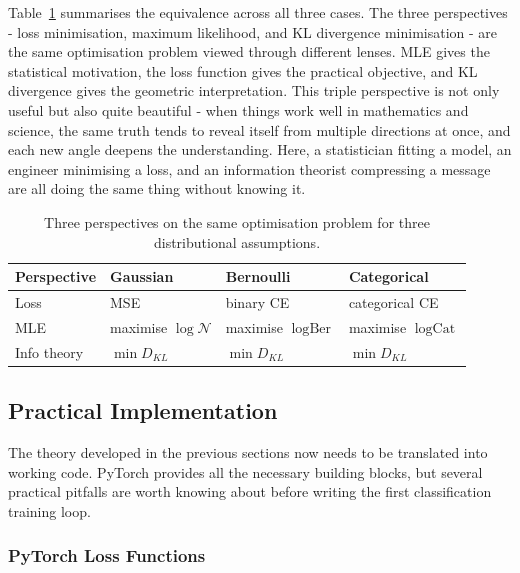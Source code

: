 Table~\ref{tab:three_views} summarises the equivalence across all three cases. The three perspectives - loss minimisation, maximum likelihood, and KL divergence minimisation - are the same optimisation problem viewed through different lenses. MLE gives the statistical motivation, the loss function gives the practical objective, and KL divergence gives the geometric interpretation. This triple perspective is not only useful but also quite beautiful - when things work well in mathematics and science, the same truth tends to reveal itself from multiple directions at once, and each new angle deepens the understanding. Here, a statistician fitting a model, an engineer minimising a loss, and an information theorist compressing a message are all doing the same thing without knowing it.

\begin{table}[h]
\centering
\begin{tabular}{llll}
\toprule
\textbf{Perspective} & \textbf{Gaussian} & \textbf{Bernoulli} & \textbf{Categorical} \\
\midrule
Loss & MSE & binary CE & categorical CE \\
MLE & maximise $\log \mathcal{N}$ & maximise $\log \text{Ber}$ & maximise $\log \text{Cat}$ \\
Info theory & $\min D_{KL}$ & $\min D_{KL}$ & $\min D_{KL}$ \\
\bottomrule
\end{tabular}
\caption{Three perspectives on the same optimisation problem for three distributional assumptions.}
\label{tab:three_views}
\end{table}

\subsection{Practical Implementation}

The theory developed in the previous sections now needs to be translated into working code. PyTorch provides all the necessary building blocks, but several practical pitfalls are worth knowing about before writing the first classification training loop.

\subsubsection{PyTorch Loss Functions}

